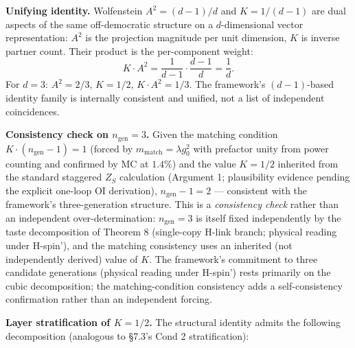 \documentclass[
]{article}
\begin{document}
\textbf{Unifying identity.} Wolfenstein \(A^2 = (d-1)/d\) and
\(K = 1/(d-1)\) are dual aspects of the same off-democratic structure on
a \(d\)-dimensional vector representation: \(A^2\) is the projection
magnitude per unit dimension, \(K\) is inverse partner count. Their
product is the per-component weight:
\[K \cdot A^2 = \frac{1}{d-1} \cdot \frac{d-1}{d} = \frac{1}{d}.\] For
\(d = 3\): \(A^2 = 2/3\), \(K = 1/2\), \(K \cdot A^2 = 1/3\). The
framework's \((d-1)\)-based identity family is internally consistent and
unified, not a list of independent coincidences.

\textbf{Consistency check on \(n_{\text{gen}} = 3\).} Given the matching
condition \(K \cdot (n_{\text{gen}} - 1) = 1\) (forced by
\(m_{\text{match}} = \lambda g_0^2\) with prefactor unity from power
counting and confirmed by MC at \(1.4\%\)) and the value \(K = 1/2\)
inherited from the standard staggered \(Z_S\) calculation (Argument 1;
plausibility evidence pending the explicit one-loop OI derivation),
\(n_{\text{gen}} - 1 = 2\) --- consistent with the framework's
three-generation structure. This is a \emph{consistency check} rather
than an independent over-determination: \(n_{\text{gen}} = 3\) is itself
fixed independently by the taste decomposition of Theorem 8 (single-copy
H-link branch; physical reading under H-spin'), and the matching
consistency uses an inherited (not independently derived) value of
\(K\). The framework's commitment to three candidate generations
(physical reading under H-spin') rests primarily on the cubic
decomposition; the matching-condition consistency adds a
self-consistency confirmation rather than an independent forcing.

\textbf{Layer stratification of \(K = 1/2\).} The structural identity
admits the following decomposition (analogous to §7.3's Cond 2
stratification):
\end{document}

